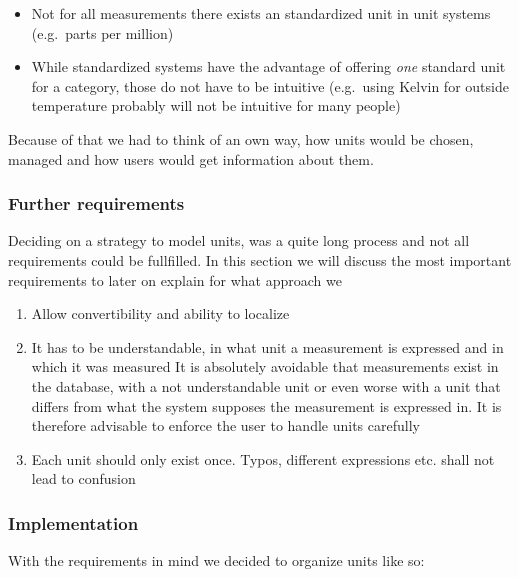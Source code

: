 \begin{itemize}
\tightlist
\item
  Not for all measurements there exists an standardized unit in unit
  systems (e.g.~parts per million)
\item
  While standardized systems have the advantage of offering \emph{one}
  standard unit for a category, those do not have to be intuitive
  (e.g.~using Kelvin for outside temperature probably will not be
  intuitive for many people)
\end{itemize}

Because of that we had to think of an own way, how units would be
chosen, managed and how users would get information about them.

\subsubsection{Further requirements}\label{further-requirements}

Deciding on a strategy to model units, was a quite long process and not
all requirements could be fullfilled. In this section we will discuss
the most important requirements to later on explain for what approach we

\begin{enumerate}
\def\labelenumi{\arabic{enumi}.}
\tightlist
\item
  Allow convertibility and ability to localize
\item
  It has to be understandable, in what unit a measurement is expressed
  and in which it was measured It is absolutely avoidable that
  measurements exist in the database, with a not understandable unit or
  even worse with a unit that differs from what the system supposes the
  measurement is expressed in. It is therefore advisable to enforce the
  user to handle units carefully
\item
  Each unit should only exist once. Typos, different expressions etc.
  shall not lead to confusion
\end{enumerate}

\subsubsection{Implementation}\label{implementation}

With the requirements in mind we decided to organize units like so:

